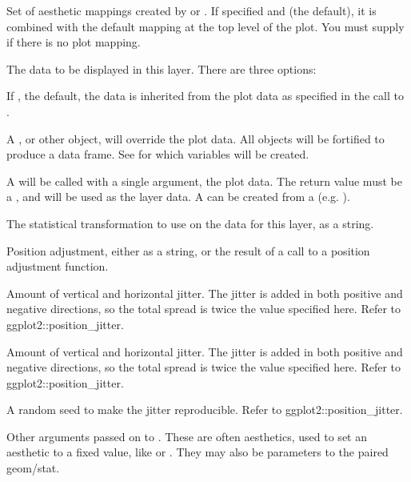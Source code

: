 \documentclass[a4paper]{book}
\begin{document}
%
\begin{Arguments}
\begin{ldescription}
\item[\code{mapping}] Set of aesthetic mappings created by  or
. If specified and  (the
default), it is combined with the default mapping at the top level of the
plot. You must supply  if there is no plot mapping.

\item[\code{data}] The data to be displayed in this layer. There are three
options:

If , the default, the data is inherited from the plot
data as specified in the call to .

A , or other object, will override the plot
data. All objects will be fortified to produce a data frame. See
 for which variables will be created.

A  will be called with a single argument,
the plot data. The return value must be a , and
will be used as the layer data. A  can be created
from a  (e.g. ).

\item[\code{stat}] The statistical transformation to use on the data for this
layer, as a string.

\item[\code{position}] Position adjustment, either as a string, or the result of
a call to a position adjustment function.

\item[\code{width}] Amount of vertical and horizontal jitter. The jitter is added in both positive and negative directions, so the total spread is twice the value specified here. Refer to ggplot2::position\_jitter.

\item[\code{height}] Amount of vertical and horizontal jitter. The jitter is added in both positive and negative directions, so the total spread is twice the value specified here. Refer to ggplot2::position\_jitter.

\item[\code{seed}] A random seed to make the jitter reproducible. Refer to ggplot2::position\_jitter.

\item[\code{...}] Other arguments passed on to . These are
often aesthetics, used to set an aesthetic to a fixed value, like
 or . They may also be parameters
to the paired geom/stat.


\end{ldescription}
\end{Arguments}
\end{document}
